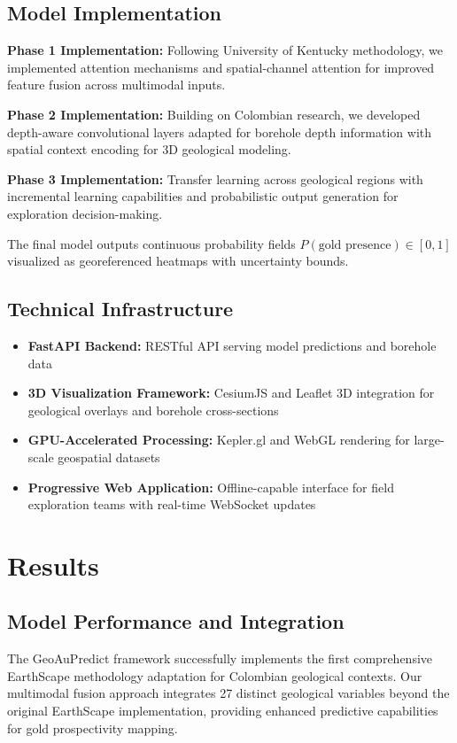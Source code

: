 \documentclass[12pt,a4paper]{article}
\begin{document}
\subsection{Model Implementation}
\textbf{Phase 1 Implementation:} Following University of Kentucky methodology, we implemented attention mechanisms and spatial-channel attention for improved feature fusion across multimodal inputs.

\textbf{Phase 2 Implementation:} Building on Colombian research, we developed depth-aware convolutional layers adapted for borehole depth information with spatial context encoding for 3D geological modeling.

\textbf{Phase 3 Implementation:} Transfer learning across geological regions with incremental learning capabilities and probabilistic output generation for exploration decision-making.

The final model outputs continuous probability fields \( P(\text{gold presence}) \in [0,1] \) visualized as georeferenced heatmaps with uncertainty bounds.

\subsection{Technical Infrastructure}
\begin{itemize}
    \item \textbf{FastAPI Backend:} RESTful API serving model predictions and borehole data
    \item \textbf{3D Visualization Framework:} CesiumJS and Leaflet 3D integration for geological overlays and borehole cross-sections
    \item \textbf{GPU-Accelerated Processing:} Kepler.gl and WebGL rendering for large-scale geospatial datasets
    \item \textbf{Progressive Web Application:} Offline-capable interface for field exploration teams with real-time WebSocket updates
\end{itemize}

\section{Results}

\subsection{Model Performance and Integration}
The GeoAuPredict framework successfully implements the first comprehensive EarthScape methodology adaptation for Colombian geological contexts. Our multimodal fusion approach integrates 27 distinct geological variables beyond the original EarthScape implementation, providing enhanced predictive capabilities for gold prospectivity mapping.
\end{document}
